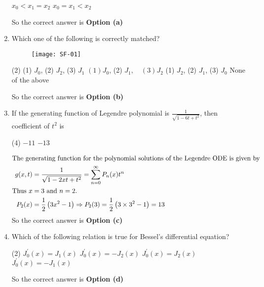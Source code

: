 \begin{enumerate}[label=\color{ocre}\textbf{\arabic*.}]
\begin{tasks}
	\task[\textbf{c.}]$x_{0}<x_{1}=x_{2}$
	\task[\textbf{d.}] $x_{0}=x_{1}<x_{2}$
\end{tasks}
\begin{answer}
	So the correct answer is \textbf{Option (a)}
\end{answer}
\item Which one of the following is correctly matched?\\
\begin{figure}[H]
	\centering
	\texttt{[image: SF-01]}
\end{figure}
 \begin{tasks}(2)
	\task[\textbf{a.}](1) $J_{0}$,
	(2) $J_{2}$, (3) $J_{1}$
	\task[\textbf{b.}]$(1) J_{0}$,
	(2) $J_{1}, \quad(3) J_{2}$
	\task[\textbf{c.}](1) $J_{2}$,
	(2) $J_{1}$,
	(3) $J_{0}$
	\task[\textbf{d.}] None of the above
\end{tasks}
\begin{answer}
	So the correct answer is \textbf{Option (b)}
\end{answer}
\item If the generating function of Legendre polynomial is $\frac{1}{\sqrt{1-6 t+t^{2}}}$, then coefficient of $t^{2}$ is
 \begin{tasks}(4)
	\task[\textbf{b.}]$-11$
	\task[\textbf{d.}] $-13$
\end{tasks}
\begin{answer}
	\begin{align*}
	\intertext{The generating function for the polynomial solutions of the Legendre ODE is given by}
	g(x, t)&=\frac{1}{\sqrt{1-2 x t+t^{2}}}=\sum_{n=0}^{\infty} P_{n}(x) t^{n}\\
	\text{Thus }x&=3\text{ and }n=2.\\
	P_{2}(x)&=\frac{1}{2}\left(3 x^{2}-1\right) \Rightarrow P_{2}(3)=\frac{1}{2}\left(3 \times 3^{2}-1\right)=13
	\end{align*}
		So the correct answer is \textbf{Option (c)}
\end{answer}
\item Which of the following relation is true for Bessel's differential equation?
 \begin{tasks}(2)
	\task[\textbf{a.}]$J_{0}^{\prime}(x)=J_{1}(x)$
	\task[\textbf{b.}]$J_{0}^{\prime}(x)=-J_{2}(x)$
	\task[\textbf{c.}]$J_{0}^{\prime}(x)=J_{2}(x)$
	\task[\textbf{d.}] $J_{0}^{\prime}(x)=-J_{1}(x)$
\end{tasks}
\begin{answer}
	So the correct answer is \textbf{Option (d)}

\end{answer}
\end{enumerate}
